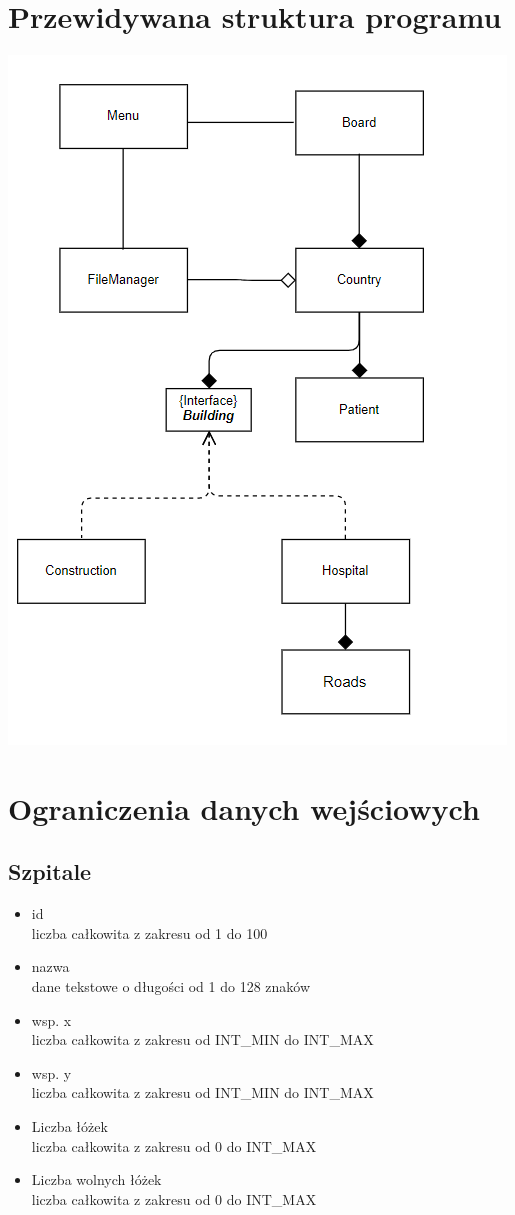 \documentclass[a4paper,12pt,twoside]{article}
\begin{document}
\section{Przewidywana struktura programu}
\begin{center}
\includegraphics[scale=1.1]{struktura}
\end{center}
\newpage
\section{Ograniczenia danych wejściowych}
\subsection{Szpitale}
\begin{itemize}
\item id\\liczba całkowita z zakresu od 1 do 100
\item nazwa\\dane tekstowe o długości od 1 do 128 znaków
\item wsp. x\\liczba całkowita z zakresu od INT\_MIN do INT\_MAX
\item wsp. y\\liczba całkowita z zakresu od INT\_MIN do INT\_MAX
\item Liczba łóżek\\liczba całkowita z zakresu od 0 do INT\_MAX
\item Liczba wolnych łóżek\\liczba całkowita z zakresu od 0 do INT\_MAX
\end{itemize}
\end{document}
